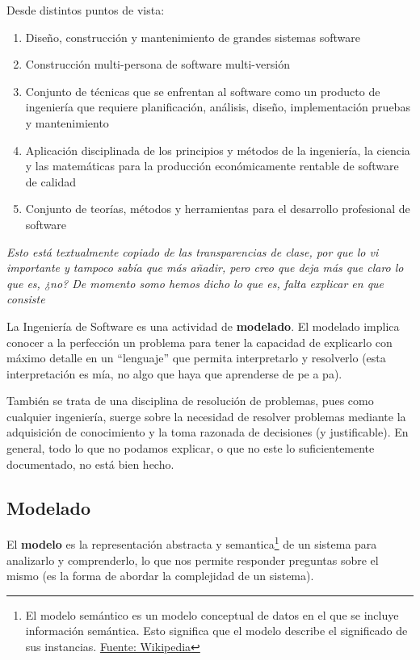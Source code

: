\noindent Desde distintos puntos de vista:
\begin{enumerate}
    \item Diseño, construcción y mantenimiento de grandes sistemas software
    \item Construcción multi-persona de software multi-versión
    \item Conjunto de técnicas que se enfrentan al software como un producto de ingeniería que requiere 
    planificación, análisis, diseño, implementación pruebas y mantenimiento
    \item Aplicación disciplinada de los principios y métodos de la ingeniería, la ciencia y las matemáticas para
    la producción económicamente rentable de software de calidad
    \item Conjunto de teorías, métodos y herramientas para el desarrollo profesional de software
\end{enumerate}

\textit{Esto está textualmente copiado de las transparencias de clase, por que lo vi importante y tampoco sabía 
que más añadir, pero creo que deja más que claro lo que es, ¿no? De momento somo hemos dicho lo que es, falta 
explicar en que consiste}

\vspace*{2mm}

La Ingeniería de Software es una actividad de \textbf{modelado}. El modelado implica conocer a la perfección un
problema para tener la capacidad de explicarlo con máximo detalle en un ``lenguaje'' que permita interpretarlo y
resolverlo (esta interpretación es mía, no algo que haya que aprenderse de pe a pa).

También se trata de una disciplina de resolución de problemas, pues como cualquier ingeniería, suerge sobre la 
necesidad de resolver problemas mediante la adquisición de conocimiento y la toma razonada de decisiones 
(y justificable). En general, todo lo que no podamos explicar, o que no este lo suficientemente documentado, no 
está bien hecho.

\newpage

\subsection{Modelado}

El \textbf{modelo} es la representación abstracta y semantica\footnote{El modelo semántico es un modelo conceptual
 de datos en el que se incluye información semántica. Esto significa que el modelo describe el significado de 
sus instancias. \href{https://es.wikipedia.org/wiki/Modelo_sem\%C3\%A1ntico_de_datos}{Fuente: Wikipedia}} de un 
sistema para analizarlo y comprenderlo, lo que nos permite responder preguntas sobre el mismo (es la forma de 
abordar la complejidad de un sistema).

